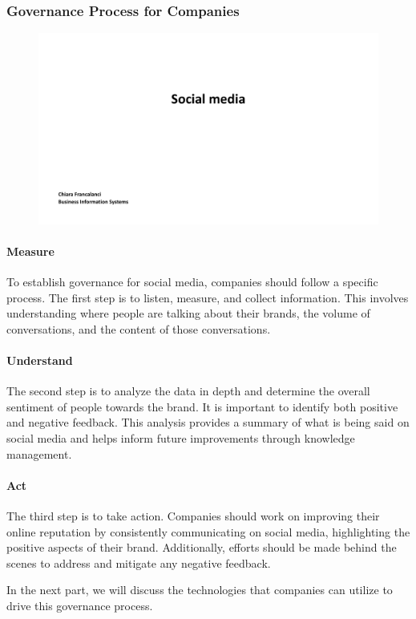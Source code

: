 \subsubsection{Governance Process for
    Companies}\label{governance-process-for-companies}

\begin{figure}[!h]
    \centering
    \includegraphics[page=23, trim = 1cm 2.5cm 4cm 0.5cm, clip, width=\textwidth]{images/04 - Social_Media.pdf}
\end{figure}

\paragraph{Measure}
To establish governance for social media, companies should follow a
specific process. The first step is to listen, measure, and collect
information. This involves understanding where people are talking about
their brands, the volume of conversations, and the content of those
conversations.

\paragraph{Understand}
The second step is to analyze the data in depth and
determine the overall sentiment of people towards the brand. It is
important to identify both positive and negative feedback. This analysis
provides a summary of what is being said on social media and helps
inform future improvements through knowledge management.

\paragraph{Act}
The third step is to take action. Companies should work on improving
their online reputation by consistently communicating on social media,
highlighting the positive aspects of their brand. Additionally, efforts
should be made behind the scenes to address and mitigate any negative
feedback.

In the next part, we will discuss the technologies that companies can
utilize to drive this governance process.
